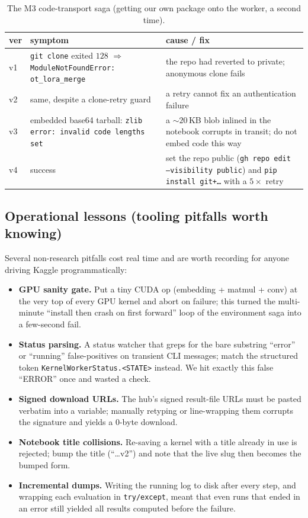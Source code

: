 \documentclass[11pt]{article}
\begin{document}
\begin{table}[h]
\centering
\caption{The M3 code-transport saga (getting our own package onto the worker, a second time).}
\label{tab:m3saga}
\small
\begin{tabular}{p{0.6cm} p{6.3cm} p{7.4cm}}
\toprule
ver & symptom & cause / fix \\
\midrule
v1 & \texttt{git clone} exited $128$ $\Rightarrow$ \texttt{ModuleNotFoundError: ot\_lora\_merge} & the repo
had reverted to private; anonymous clone fails \\
v2 & same, despite a clone-retry guard & a retry cannot fix an authentication failure \\
v3 & embedded base64 tarball: \texttt{zlib error: invalid code lengths set} & a $\sim\!20$\,KB blob inlined
in the notebook corrupts in transit; do not embed code this way \\
v4 & success & set the repo public (\texttt{gh repo edit --visibility public}) and
\texttt{pip install git+\dots} with a $5\times$ retry \\
\bottomrule
\end{tabular}
\end{table}

\subsection{Operational lessons (tooling pitfalls worth knowing)}
\label{app:ops}
Several non-research pitfalls cost real time and are worth recording for anyone driving Kaggle
programmatically:
\begin{itemize}[leftmargin=1.4em,itemsep=2pt]
\item \textbf{GPU sanity gate.} Put a tiny CUDA op (embedding + matmul + conv) at the very top of every GPU
kernel and abort on failure; this turned the multi-minute ``install then crash on first forward'' loop of
the environment saga into a few-second fail.
\item \textbf{Status parsing.} A status watcher that greps for the bare substring ``error'' or ``running''
false-positives on transient CLI messages; match the structured token \texttt{KernelWorkerStatus.<STATE>}
instead. We hit exactly this false ``ERROR'' once and wasted a check.
\item \textbf{Signed download URLs.} The hub's signed result-file URLs must be pasted verbatim into a
variable; manually retyping or line-wrapping them corrupts the signature and yields a $0$-byte download.
\item \textbf{Notebook title collisions.} Re-saving a kernel with a title already in use is rejected; bump
the title (``\dots v2'') and note that the live slug then becomes the bumped form.
\item \textbf{Incremental dumps.} Writing the running log to disk after every step, and wrapping each
evaluation in \texttt{try/except}, meant that even runs that ended in an error still yielded all results
computed before the failure.
\end{itemize}
\end{document}
